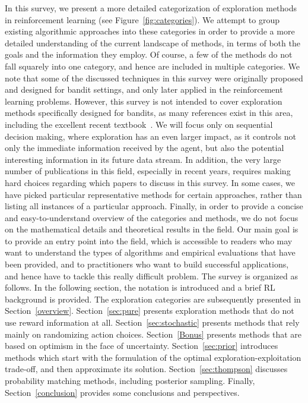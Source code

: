 In this survey, we present a more detailed categorization of exploration methods in reinforcement learning (see Figure~\ref{fig:categories}). We attempt to group existing algorithmic approaches into these categories in order to provide a more detailed understanding of the current landscape of methods, in terms of both the goals and the information they employ. Of course, a few of the methods do not fall squarely into one category, and hence are included in multiple categories.
We note that some of the discussed techniques in this survey were originally proposed and designed for bandit settings, and only later applied in the reinforcement learning problems. However, this survey is not intended to cover exploration methods specifically designed for bandits, as many references exist in this area, including the excellent recent textbook~. We will focus only on sequential decision making, where exploration has an even larger impact, as it controls not only the immediate information received by the agent, but also the potential interesting information in its future data stream. 
In addition, the very large number of publications in this field, especially in recent years, requires making hard choices regarding which papers to discuss in this survey. In some cases, we have picked particular representative methods for certain approaches, rather than listing all instances of a particular approach. Finally,  in order to provide a concise and easy-to-understand overview of the categories and methods, we do not focus on the mathematical details and theoretical results in the field. Our main goal is to provide an entry point into the field, which is accessible to readers who may want to understand the types of algorithms and empirical evaluations that have been provided, and to practitioners who want to build successful applications, and hence have to tackle this really difficult problem. 
The survey is organized as follows. In the following section, the notation is introduced and a brief RL background is provided. The exploration categories are subsequently presented in Section~\ref{overview}. Section~\ref{sec:pure} presents exploration methods that do not use reward information at all. Section~\ref{sec:stochastic} presents methods that rely mainly on randomizing action choices. Section~\ref{Bonus} presents methods that are based on optimism in the face of uncertainty. Section~\ref{sec:prior} introduces methods which start with the formulation of the optimal exploration-exploitation trade-off, and then approximate its solution. Section~\ref{sec:thompson} discusses probability matching methods, including posterior sampling. Finally, Section~\ref{conclusion} provides some conclusions and perspectives.

